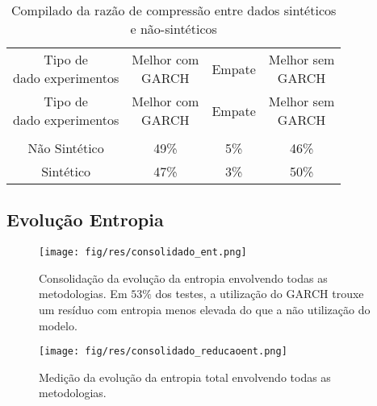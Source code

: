  \begin{center}
\begin{longtable}{cccc}
\toprule
\rowcolor{white}
 \caption{Compilado da razão de compressão entre dados sintéticos e
 não-sintéticos} \label{Tabela:RazaoCompressaoSinteticoOuNaoSintetico} \\
\midrule
\rowcolor{white}
   \specialcell{Tipo de\\dado experimentos} & \specialcell{Melhor com\\GARCH} &
   Empate & \specialcell{Melhor sem\\GARCH} \\
\midrule
\endfirsthead
\midrule
\rowcolor{white}
   \specialcell{Tipo de\\dado experimentos} & \specialcell{Melhor com\\GARCH} &
   Empate & \specialcell{Melhor sem\\GARCH} \\
\toprule
\endhead
\midrule \\ %
\endfoot
\bottomrule
\endlastfoot
    Não Sintético & 49\%  & 5\%   & 46\% \\
    Sintético & 47\%  & 3\%   & 50\% \\
\end{longtable}
\end{center}

\subsection{Evolução Entropia}

\begin{figure}[hbtp]
\centering
\texttt{[image: fig/res/consolidado\_ent.png]}
\caption[Redução de entropia consolidada]{Consolidação da evolução da entropia
envolvendo todas as metodologias. Em $53\%$ dos testes, a utilização do GARCH
trouxe um resíduo com entropia menos elevada do que a não utilização do modelo.}
\label{Figura:ConsolidadoEE}
\end{figure}

\begin{figure}[hbtp]
\centering
\texttt{[image: fig/res/consolidado\_reducaoent.png]}
\caption[Métrica de redução de entropia consolidada]{Medição da evolução da
entropia total envolvendo todas as metodologias.}
\label{Figura:ConsolidadoEEMetrica}
\end{figure}

